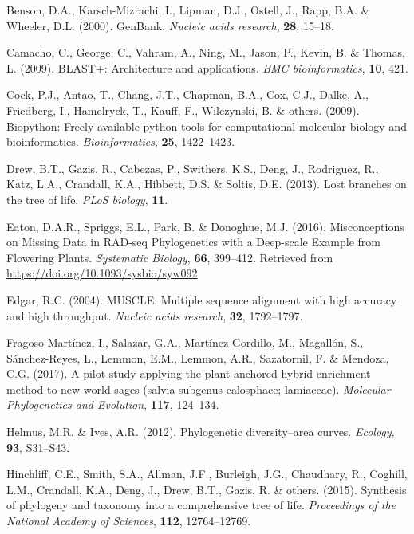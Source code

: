 \documentclass[]{article}
\begin{document}
\leavevmode\hypertarget{ref-benson2000genbank}{}%
Benson, D.A., Karsch-Mizrachi, I., Lipman, D.J., Ostell, J., Rapp, B.A. \& Wheeler, D.L. (2000). GenBank. \emph{Nucleic acids research}, \textbf{28}, 15--18.

\leavevmode\hypertarget{ref-camacho2009blast}{}%
Camacho, C., George, C., Vahram, A., Ning, M., Jason, P., Kevin, B. \& Thomas, L. (2009). BLAST+: Architecture and applications. \emph{BMC bioinformatics}, \textbf{10}, 421.

\leavevmode\hypertarget{ref-cock2009biopython}{}%
Cock, P.J., Antao, T., Chang, J.T., Chapman, B.A., Cox, C.J., Dalke, A., Friedberg, I., Hamelryck, T., Kauff, F., Wilczynski, B. \& others. (2009). Biopython: Freely available python tools for computational molecular biology and bioinformatics. \emph{Bioinformatics}, \textbf{25}, 1422--1423.

\leavevmode\hypertarget{ref-drew2013lost}{}%
Drew, B.T., Gazis, R., Cabezas, P., Swithers, K.S., Deng, J., Rodriguez, R., Katz, L.A., Crandall, K.A., Hibbett, D.S. \& Soltis, D.E. (2013). Lost branches on the tree of life. \emph{PLoS biology}, \textbf{11}.

\leavevmode\hypertarget{ref-eaton2016misconceptions}{}%
Eaton, D.A.R., Spriggs, E.L., Park, B. \& Donoghue, M.J. (2016). Misconceptions on Missing Data in RAD-seq Phylogenetics with a Deep-scale Example from Flowering Plants. \emph{Systematic Biology}, \textbf{66}, 399--412. Retrieved from \url{https://doi.org/10.1093/sysbio/syw092}

\leavevmode\hypertarget{ref-edgar2004muscle}{}%
Edgar, R.C. (2004). MUSCLE: Multiple sequence alignment with high accuracy and high throughput. \emph{Nucleic acids research}, \textbf{32}, 1792--1797.

\leavevmode\hypertarget{ref-fragoso2017pilot}{}%
Fragoso-Martínez, I., Salazar, G.A., Martínez-Gordillo, M., Magallón, S., Sánchez-Reyes, L., Lemmon, E.M., Lemmon, A.R., Sazatornil, F. \& Mendoza, C.G. (2017). A pilot study applying the plant anchored hybrid enrichment method to new world sages (salvia subgenus calosphace; lamiaceae). \emph{Molecular Phylogenetics and Evolution}, \textbf{117}, 124--134.

\leavevmode\hypertarget{ref-helmus2012phylogenetic}{}%
Helmus, M.R. \& Ives, A.R. (2012). Phylogenetic diversity--area curves. \emph{Ecology}, \textbf{93}, S31--S43.

\leavevmode\hypertarget{ref-hinchliff2015synthesis}{}%
Hinchliff, C.E., Smith, S.A., Allman, J.F., Burleigh, J.G., Chaudhary, R., Coghill, L.M., Crandall, K.A., Deng, J., Drew, B.T., Gazis, R. \& others. (2015). Synthesis of phylogeny and taxonomy into a comprehensive tree of life. \emph{Proceedings of the National Academy of Sciences}, \textbf{112}, 12764--12769.
\end{document}
